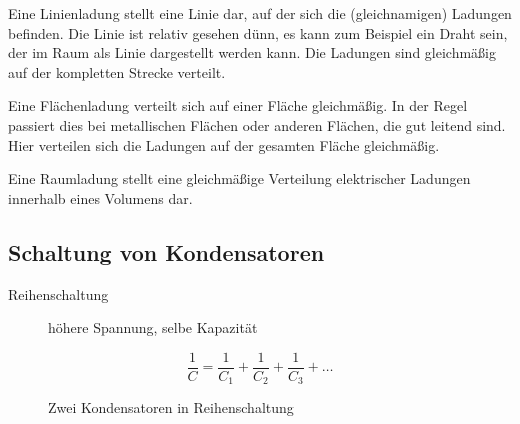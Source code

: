Eine Linienladung stellt eine Linie dar, auf der sich die (gleichnamigen) Ladungen befinden. Die Linie ist relativ gesehen dünn, es kann zum Beispiel ein Draht sein, der im Raum als Linie dargestellt werden kann. Die Ladungen sind gleichmäßig auf der kompletten Strecke verteilt.

Eine Flächenladung verteilt sich auf einer Fläche gleichmäßig. In der Regel passiert dies bei metallischen Flächen oder anderen Flächen, die gut leitend sind. Hier verteilen sich die Ladungen auf der gesamten Fläche gleichmäßig.

Eine Raumladung stellt eine gleichmäßige Verteilung elektrischer Ladungen innerhalb eines Volumens dar.

\subsection[Schalt. von Cs]{Schaltung von Kondensatoren}

\begin{frame}
  \begin{description}
    \item [Reihenschaltung] höhere Spannung, selbe Kapazität
  \end{description}
  \begin{equation}
    \frac{1}{C}=\frac{1}{C_1}+\frac{1}{C_2}+\frac{1}{C_3}+\dots
    \label{eq:2CsInReihe}
  \end{equation}

  \begin{figure}[htb]
    \caption{Zwei Kondensatoren in Reihenschaltung}
    \label{fig:2CsInReihe}
  \end{figure}
\end{frame}

